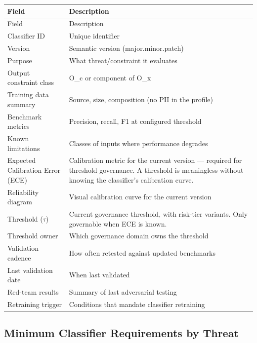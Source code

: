 \small
\begin{longtable}{@{}>{\raggedright\arraybackslash}p{2.48cm}>{\raggedright\arraybackslash}p{12.22cm}@{}}
  \toprule
  Field & Description \\
  \midrule
\endfirsthead
  \toprule
  Field & Description \\
  \midrule
\endhead
  \bottomrule
\endlastfoot
  Classifier ID & Unique identifier \\
  Version & Semantic version (major.minor.patch) \\
  Purpose & What threat/constraint it evaluates \\
  Output constraint class & O\_\allowbreak{}c or component of O\_\allowbreak{}x \\
  Training data summary & Source, size, composition (no PII in the profile) \\
  Benchmark metrics & Precision, recall, F1 at configured threshold \\
  Known limitations & Classes of inputs where performance degrades \\
  Expected Calibration Error (ECE) & Calibration metric for the current version --- required for threshold governance. A threshold is meaningless without knowing the classifier's calibration curve. \\
  Reliability diagram & Visual calibration curve for the current version \\
  Threshold ($\tau$) & Current governance threshold, with risk-tier variants. Only governable when ECE is known. \\
  Threshold owner & Which governance domain owns the threshold \\
  Validation cadence & How often retested against updated benchmarks \\
  Last validation date & When last validated \\
  Red-team results & Summary of last adversarial testing \\
  Retraining trigger & Conditions that mandate classifier retraining \\
\end{longtable}
\normalsize


\subsection{Minimum Classifier Requirements by Threat}
\label{sec:templates-C-2-2}


